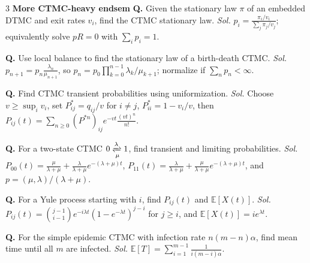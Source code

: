 \documentclass[a4paper,8pt,fleqn]{extarticle}
\newcommand{\E}{\mathbb{E}}
\newcommand{\1}{\mathbf{1}}
\newcommand{\sub}[1]{\textbf{#1} }
\newcommand{\probq}[2]{\textbf{Q.} #1 \emph{Sol.} #2\par}
\begin{document}
\begin{multicols}{3}
\sub{More CTMC-heavy endsem}
\probq{Given the stationary law \(\pi\) of an embedded DTMC and exit rates \(v_i\), find the CTMC stationary law.}{\(\displaystyle p_i=\frac{\pi_i/v_i}{\sum_j \pi_j/v_j}\); equivalently solve \(pR=0\) with \(\sum_i p_i=1\).}
\probq{Use local balance to find the stationary law of a birth-death CTMC.}{\(\displaystyle p_{n+1}=p_n\frac{\lambda_n}{\mu_{n+1}}\), so \(p_n=p_0\prod_{k=0}^{n-1}\lambda_k/\mu_{k+1}\); normalize if \(\sum_n p_n<\infty\).}
\probq{Find CTMC transient probabilities using uniformization.}{Choose \(v\ge \sup_i v_i\), set \(P^*_{ij}=q_{ij}/v\) for \(i\ne j\), \(P^*_{ii}=1-v_i/v\), then \(\displaystyle P_{ij}(t)=\sum_{n\ge0}(P^{*n})_{ij}e^{-vt}\frac{(vt)^n}{n!}\).}
\probq{For a two-state CTMC \(0\xrightleftharpoons[\mu]{\lambda}1\), find transient and limiting probabilities.}{\(\displaystyle P_{00}(t)=\frac{\mu}{\lambda+\mu}+\frac{\lambda}{\lambda+\mu}e^{-(\lambda+\mu)t}\), \(\displaystyle P_{11}(t)=\frac{\lambda}{\lambda+\mu}+\frac{\mu}{\lambda+\mu}e^{-(\lambda+\mu)t}\), and \(p=(\mu,\lambda)/(\lambda+\mu)\).}
\probq{For a Yule process starting with \(i\), find \(P_{ij}(t)\) and \(\E[X(t)]\).}{\(\displaystyle P_{ij}(t)=\binom{j-1}{i-1}e^{-i\lambda t}(1-e^{-\lambda t})^{j-i}\) for \(j\ge i\), and \(\E[X(t)]=ie^{\lambda t}\).}
\probq{For the simple epidemic CTMC with infection rate \(n(m-n)\alpha\), find mean time until all \(m\) are infected.}{\(\displaystyle \E[T]=\sum_{i=1}^{m-1}\frac{1}{i(m-i)\alpha}\).}


\end{multicols}
\end{document}
